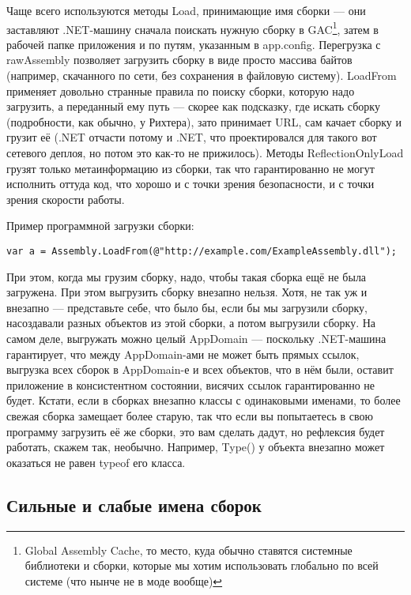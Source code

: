 \documentclass[a5paper]{article}
\begin{document}
Чаще всего используются методы Load, принимающие имя сборки --- они заставляют .NET-машину сначала поискать нужную сборку в GAC\footnote{Global Assembly Cache, то место, куда обычно ставятся системные библиотеки и сборки, которые мы хотим использовать глобально по всей системе (что нынче не в моде вообще)}, затем в рабочей папке приложения и по путям, указанным в app.config. Перегрузка с rawAssembly позволяет загрузить сборку в виде просто массива байтов (например, скачанного по сети, без сохранения в файловую систему). LoadFrom применяет довольно странные правила по поиску сборки, которую надо загрузить, а переданный ему путь --- скорее как подсказку, где искать сборку (подробности, как обычно, у Рихтера), зато принимает URL, сам качает сборку и грузит её (.NET отчасти потому и .NET, что проектировался для такого вот сетевого деплоя, но потом это как-то не прижилось). Методы ReflectionOnlyLoad грузят только метаинформацию из сборки, так что гарантированно не могут исполнить оттуда код, что хорошо и с точки зрения безопасности, и с точки зрения скорости работы.

Пример программной загрузки сборки:

\begin{verbatim}
var a = Assembly.LoadFrom(@"http://example.com/ExampleAssembly.dll");
\end{verbatim}

При этом, когда мы грузим сборку, надо, чтобы такая сборка ещё не была загружена. При этом выгрузить сборку внезапно нельзя. Хотя, не так уж и внезапно --- представьте себе, что было бы, если бы мы загрузили сборку, насоздавали разных объектов из этой сборки, а потом выгрузили сборку. На самом деле, выгружать можно целый AppDomain --- поскольку .NET-машина гарантирует, что между AppDomain-ами не может быть прямых ссылок, выгрузка всех сборок в AppDomain-е и всех объектов, что в нём были, оставит приложение в консистентном состоянии, висячих ссылок гарантированно не будет. Кстати, если в сборках внезапно классы с одинаковыми именами, то более свежая сборка замещает более старую, так что если вы попытаетесь в свою программу загрузить её же сборки, это вам сделать дадут, но рефлексия будет работать, скажем так, необычно. Например, Type() у объекта внезапно может оказаться не равен typeof его класса.

\subsection{Сильные и слабые имена сборок}
\end{document}
